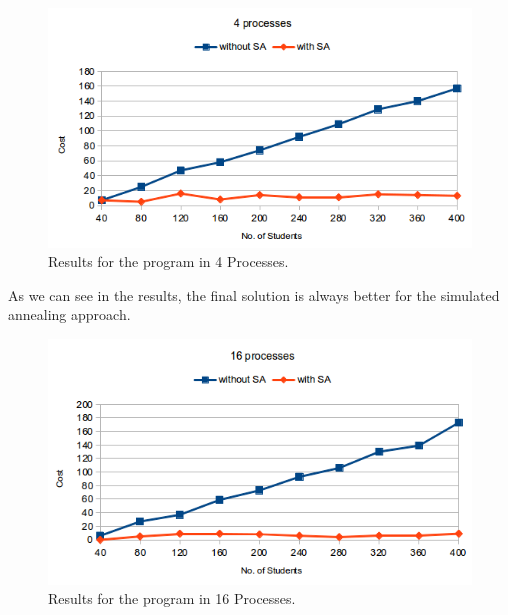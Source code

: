 \documentclass[a4paper,10pt,openright,openbib,twocolumn]{article}
\begin{document}
\begin{figure}[!htb]
    \centering
    \begin{minipage}[t]{\columnwidth}
        \includegraphics[width=\textwidth]{./img/arc4-4.png}
        \caption{Results for the program in 4 Processes.\label{fig:parallel}}
    \end{minipage}
\end{figure}

As we can see in the results, the final solution is always better for the simulated annealing approach.


\begin{figure}[!htb]
    \centering
    \begin{minipage}[t]{\columnwidth}
        \includegraphics[width=\textwidth]{./img/arc4-16.png}
        \caption{Results for the program in 16 Processes.\label{fig:parallel}}
    \end{minipage}
\end{figure}
\end{document}

